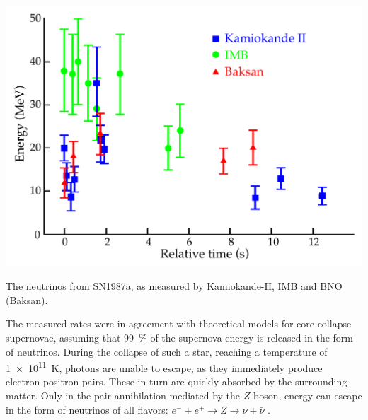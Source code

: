 \documentclass[
    a4paper, %
    fontsize=10pt, %
    twoside=false, %
    numbers=noenddot, %
    fontmethod=tex,
]{kaobook}
\begin{document}
\begin{marginfigure}
    \includegraphics{theory/sn1987a_flux.pdf}
    \caption[Neutrinos from SN1987a]{The neutrinos from SN1987a, as measured by Kamiokande-II, IMB and BNO (Baksan).}
\end{marginfigure}

The measured rates were in agreement with theoretical models for core-collapse supernovae, assuming that \SI{99}{\percent} of the supernova energy is released in the form of neutrinos. During the collapse of such a star, reaching a temperature of \SI{1e11}{\K}, photons are unable to escape, as they immediately produce electron-positron pairs. These in turn are quickly absorbed by the surrounding matter. Only in the pair-annihilation mediated by the $Z$ boson, energy can escape in the form of neutrinos of all flavors: $e^- + e^+ \rightarrow Z \rightarrow \nu + \bar{\nu}$ .

% 
% 
% 

\end{document}
